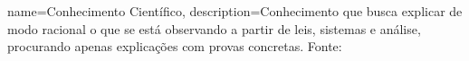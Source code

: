     {name={Conhecimento Científico}, description={Conhecimento que busca explicar de modo racional o que se está observando a partir de leis, sistemas e análise, procurando apenas explicações com provas concretas. Fonte: \cite{wikipedia_conhecimento_2021}}}